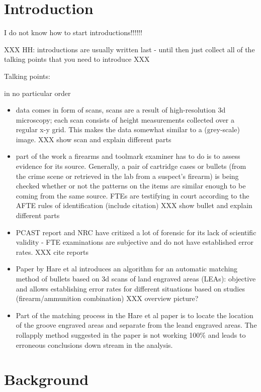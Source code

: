\documentclass[12pt]{article}
\theoremstyle{nonumberplain}
\begin{document}

\lhead{\today}

\section{Introduction}
I do not know how to start introductions!!!!!! 

XXX HH: introductions are usually written last - until then just collect all of the talking points that you need to introduce XXX

Talking points:

in no particular order

\begin{itemize}
\item data comes in form of scans, scans are a result of high-resolution 3d microscopy; each scan consists of height measurements collected over a regular x-y grid. This makes the data somewhat similar to a (grey-scale) image. XXX show scan and explain different parts
\item part of the work a firearms and toolmark examiner has to do is to assess evidence for its source. Generally, a pair of cartridge cases or bullets (from the crime scene or retrieved in the lab from a suspect's firearm) is being checked whether or not the patterns on the items are similar enough to be coming from the same source. FTEs are testifying in court according to the AFTE rules of identification (include citation) XXX show bullet and explain different parts
\item PCAST report and NRC have critized a lot of forensic for its lack of scientific validity - FTE examinations are subjective and do not have established error rates. XXX cite reports
\item Paper by Hare et al introduces an algorithm for an automatic matching method of bullets based on 3d scans of land engraved areas (LEAs): objective and allows establishing error rates for different situations based on studies (firearm/ammunition combination) XXX overview picture?
\item Part of the matching process in the Hare et al paper is to locate the location of the groove engraved areas and separate from the leand engraved areas. The rollapply method suggested in the paper is not working 100\% and leads to erroneous conclusions down stream in the analysis. 
\end{itemize}

\section{Background}
\end{document}
